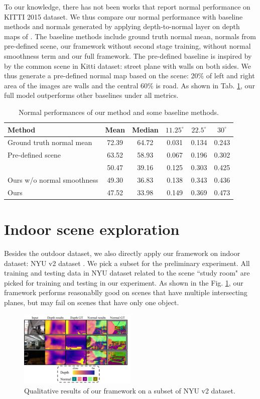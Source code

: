 To our knowledge, there has not been works that report normal performance on KITTI 2015 dataset. We thus compare our normal performance with baseline methods and normals generated by applying depth-to-normal layer on depth maps of \cite{zhou2017unsupervised}. The baseline methods include ground truth normal mean, normals from pre-defined scene, our framework without second stage training, \ie without normal smoothness term and our full framework. The pre-defined baseline is inspired by by the common scene in Kitti dataset: street plane with walls on both sides. We thus generate a pre-defined normal map based on the scene: 20\% of left and right area of the images are walls and the central 60\% is road.  As shown in Tab. \ref{tbl:normal}, our full model outperforms other baselines under all metrics.

\begin{table}[] \small
\centering
\caption{Normal performances of our method and some baseline methods.}
\label{tbl:normal}
\fontsize{6.5}{7}\selectfont
\bgroup
\def\arraystretch{1.2}
\begin{tabular}{l|c|c|c|c|c}
\thickhline
Method                        & Mean  & Median & $11.25^{\circ}$ & $22.5^{\circ}$  & $30^{\circ}$    \\ \hline
Ground truth normal mean      & 72.39 & 64.72  & 0.031 & 0.134 & 0.243 \\
Pre-defined scene             & 63.52 & 58.93  & 0.067 & 0.196 & 0.302 \\
\cite{zhou2017unsupervised} & 50.47 & 39.16  & 0.125 & 0.303 & 0.425 \\
Ours w/o normal smoothness    & 49.30 & 36.83  & 0.138 & 0.343 & 0.436 \\
Ours                          & 47.52 & 33.98  & 0.149 & 0.369 & 0.473 \\ \hline
\end{tabular}
\egroup
\end{table}

\section{Indoor scene exploration}

Besides the outdoor dataset, we also directly apply our framework on indoor dataset: NYU v2 dataset \cite{silberman2012indoor}. We pick a subset for the preliminary experiment. All training and testing data in NYU dataset related to the scene ``study room" are picked for training and testing in our experiment. As shown in the Fig. \ref{fig:nyu_visual}, our framework performs reasonablly good on scenes that have multiple intersecting planes, but may fail on scenes that have only one object.

\begin{figure}
\centering
\includegraphics[width=0.5\textwidth]{figures/indoor_visual.pdf}
\caption{Qualitative results of our framework on a subset of NYU v2 dataset.}
\label{fig:nyu_visual}
\end{figure}

